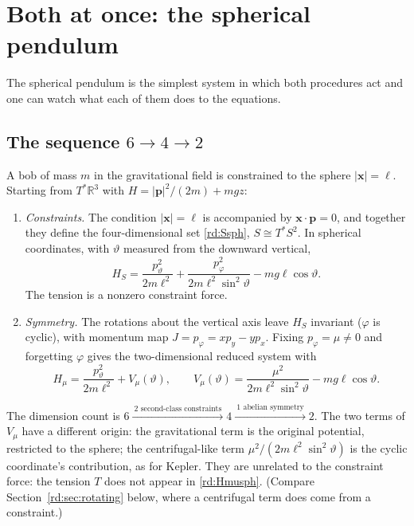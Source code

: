 \section{Both at once: the spherical pendulum}\label{rd:sec:sph}

The spherical pendulum is the simplest system in which both procedures act and one can watch what each of them does to the equations.

\subsection{The sequence $6\to4\to2$}\label{rd:sec:sph64}

A bob of mass $m$ in the gravitational field is constrained to the sphere $|\mathbf x|=\ell$. Starting from $T^*\mathbb R^3$ with $H=|\mathbf p|^2/(2m)+mgz$:

\begin{enumerate}
\item \emph{Constraints.} The condition $|\mathbf x|=\ell$ is accompanied by $\mathbf x\cdot\mathbf p=0$, and together they define the four-dimensional set \eqref{rd:Ssph}, $S\cong T^*S^2$. In spherical coordinates, with $\vartheta$ measured from the downward vertical,
\begin{equation}\label{rd:HS}
H_S=\frac{p_\vartheta^2}{2m\ell^2}+\frac{p_\varphi^2}{2m\ell^2\sin^2\vartheta}-mg\ell\cos\vartheta .
\end{equation}
The tension is a nonzero constraint force.
\item \emph{Symmetry.} The rotations about the vertical axis leave $H_S$ invariant ($\varphi$ is cyclic), with momentum map $J=p_\varphi=xp_y-yp_x$. Fixing $p_\varphi=\mu\neq0$ and forgetting $\varphi$ gives the two-dimensional reduced system with
\begin{equation}\label{rd:Hmusph}
H_\mu=\frac{p_\vartheta^2}{2m\ell^2}+V_\mu(\vartheta),\qquad V_\mu(\vartheta)=\frac{\mu^2}{2m\ell^2\sin^2\vartheta}-mg\ell\cos\vartheta .
\end{equation}
\end{enumerate}
The dimension count is $6\xrightarrow{\ \text{2 second-class constraints}\ }4\xrightarrow{\ \text{1 abelian symmetry}\ }2$. The two terms of $V_\mu$ have a different origin: the gravitational term is the original potential, restricted to the sphere; the centrifugal-like term $\mu^2/(2m\ell^2\sin^2\vartheta)$ is the cyclic coordinate's contribution, as for Kepler. They are unrelated to the constraint force: the tension $T$ does not appear in \eqref{rd:Hmusph}. (Compare Section~\ref{rd:sec:rotating} below, where a centrifugal term does come from a constraint.)

